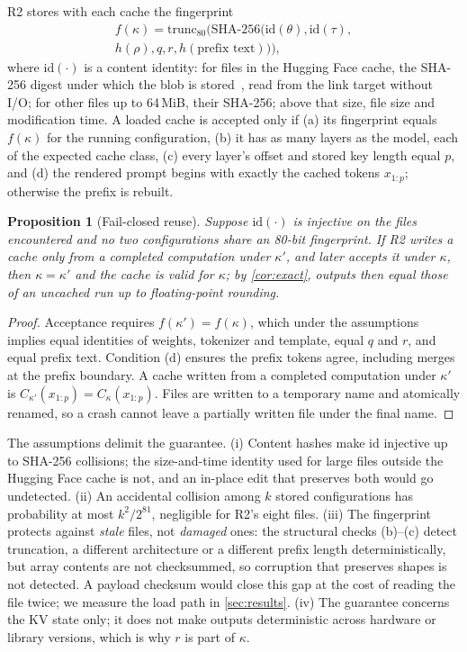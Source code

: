 \documentclass[10pt,twocolumn,letterpaper]{article}
\newtheorem{proposition}{Proposition}
\theoremstyle{definition}
\begin{document}
R2 stores with each cache the fingerprint
\begin{multline}
f(\kappa)=\mathrm{trunc}_{80}\big(\mathrm{SHA\text{-}256}(\mathrm{id}(\theta),\mathrm{id}(\tau),\\
h(\rho),q,r,h(\text{prefix text}))\big),\label{eq:fp}
\end{multline}
where $\mathrm{id}(\cdot)$ is a content identity: for files in the Hugging Face cache, the SHA-256
digest under which the blob is stored~\cite{hfcache2025}, read from the link target without I/O; for
other files up to 64\,MiB, their SHA-256; above that size, file size and modification time. A loaded
cache is accepted only if (a) its fingerprint equals $f(\kappa)$ for the running configuration,
(b) it has as many layers as the model, each of the expected cache class, (c) every layer's offset
and stored key length equal $p$, and (d) the rendered prompt begins with exactly the cached tokens
$x_{1:p}$; otherwise the prefix is rebuilt.

\begin{proposition}[Fail-closed reuse]\label{prop:validity}
Suppose $\mathrm{id}(\cdot)$ is injective on the files encountered and no two configurations share
an 80-bit fingerprint. If R2 writes a cache only from a completed computation under $\kappa'$, and
later accepts it under $\kappa$, then $\kappa=\kappa'$ and the cache is valid for $\kappa$;
by \cref{cor:exact}, outputs then equal those of an uncached run up to floating-point rounding.
\end{proposition}
\begin{proof}
Acceptance requires $f(\kappa')=f(\kappa)$, which under the assumptions implies equal identities
of weights, tokenizer and template, equal $q$ and $r$, and equal prefix text. Condition (d)
ensures the prefix tokens agree, including merges at the prefix boundary. A cache written from a
completed computation under $\kappa'$ is $C_{\kappa'}(x_{1:p})=C_\kappa(x_{1:p})$. Files are
written to a temporary name and atomically renamed, so a crash cannot leave a partially written
file under the final name.
\end{proof}

\noindent The assumptions delimit the guarantee. (i) Content hashes make $\mathrm{id}$ injective up to
SHA-256 collisions; the size-and-time identity used for large files outside the Hugging Face cache
is not, and an in-place edit that preserves both would go undetected. (ii) An accidental collision
among $k$ stored configurations has probability at most $k^2/2^{81}$, negligible for R2's eight
files. (iii) The fingerprint protects against \emph{stale} files, not \emph{damaged} ones: the
structural checks (b)--(c) detect truncation, a different architecture or a different prefix length
deterministically, but array contents are not checksummed, so corruption that preserves shapes is not
detected. A payload checksum would close this gap at the cost of reading the file twice; we measure
the load path in \cref{sec:results}. (iv) The guarantee concerns the KV state only; it does not make
outputs deterministic across hardware or library versions, which is why $r$ is part of $\kappa$.
\end{document}
